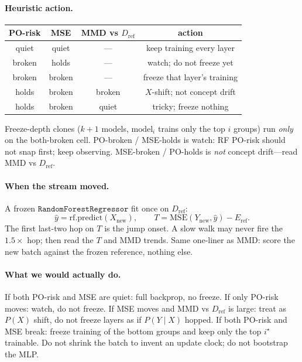 \documentclass[11pt]{article}
\begin{document}
\paragraph{Heuristic action.}
\begin{center}
\begin{tabular}{cccc}
\toprule
PO-risk & MSE & MMD vs $D_{\mathrm{ref}}$ & action \\
\midrule
quiet & quiet & --- & keep training every layer \\
broken & holds & --- & watch; do not freeze yet \\
broken & broken & --- & freeze that layer's training \\
holds & broken & broken & $X$-shift; not concept drift \\
holds & broken & quiet & tricky; freeze nothing \\
\bottomrule
\end{tabular}
\end{center}
Freeze-depth clones ($k{+}1$ models, $\mathrm{model}_i$ trains only the top $i$ groups) run \emph{only} on the both-broken cell.
PO-broken / MSE-holds is watch: RF PO-risk should not snap first; keep observing.
MSE-broken / PO-holds is \emph{not} concept drift---read MMD vs $D_{\mathrm{ref}}$.

\paragraph{When the stream moved.}
A frozen $\mathtt{RandomForestRegressor}$ fit once on $D_{\mathrm{ref}}$:
\[
\hat y=\mathrm{rf.predict}(X_{\mathrm{new}}),\qquad
T=\mathrm{MSE}(Y_{\mathrm{new}},\hat y)-E_{\mathrm{ref}}.
\]
The first last-two hop on $T$ is the jump onset.
A slow walk may never fire the $1.5\times$ hop; then read the $T$ and MMD trends.
Same one-liner as MMD: score the new batch against the frozen reference, nothing else.

\paragraph{What we would actually do.}
If both PO-risk and MSE are quiet: full backprop, no freeze.
If only PO-risk moves: watch, do not freeze.
If MSE moves and MMD vs $D_{\mathrm{ref}}$ is large: treat as $P(X)$ shift, do not freeze layers as if $P(Y\mid X)$ hopped.
If both PO-risk and MSE break: freeze training of the bottom groups and keep only the top $i^\star$ trainable.
Do not shrink the batch to invent an update clock; do not bootstrap the MLP.
\end{document}
